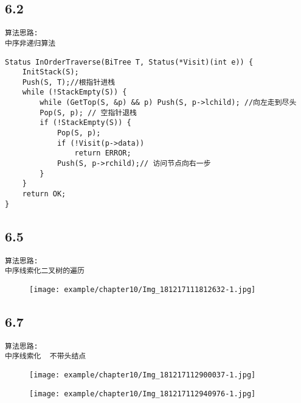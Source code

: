 \subsection{6.2}
\begin{lstlisting}[basicstyle=\small\ttfamily, caption={}, numbers=none]
算法思路:
中序非递归算法
\end{lstlisting}
\begin{lstlisting}[basicstyle=\small\ttfamily, caption={}, numbers=none]
Status InOrderTraverse(BiTree T, Status(*Visit)(int e)) {
	InitStack(S);
	Push(S, T);//根指针进栈
	while (!StackEmpty(S)) {
		while (GetTop(S, &p) && p) Push(S, p->lchild); //向左走到尽头
		Pop(S, p); // 空指针退栈
		if (!StackEmpty(S)) {
			Pop(S, p);
			if (!Visit(p->data))
				return ERROR;
			Push(S, p->rchild);// 访问节点向右一步
		}
	}
	return OK;
}
\end{lstlisting}

\subsection{6.5}
\begin{lstlisting}[basicstyle=\small\ttfamily, caption={}, numbers=none]
算法思路:
中序线索化二叉树的遍历
\end{lstlisting}
\begin{figure}[H]
	\centering  %
	\texttt{[image: example/chapter10/Img\_181217111812632-1.jpg]}
\end{figure}

\subsection{6.7}
\begin{lstlisting}[basicstyle=\small\ttfamily, caption={}, numbers=none]
算法思路:
中序线索化  不带头结点
\end{lstlisting}
\begin{figure}[H]
	\centering  %
	\texttt{[image: example/chapter10/Img\_181217112900037-1.jpg]}
\end{figure}
\begin{figure}[H]
	\centering  %
	\texttt{[image: example/chapter10/Img\_181217112940976-1.jpg]}
\end{figure}

